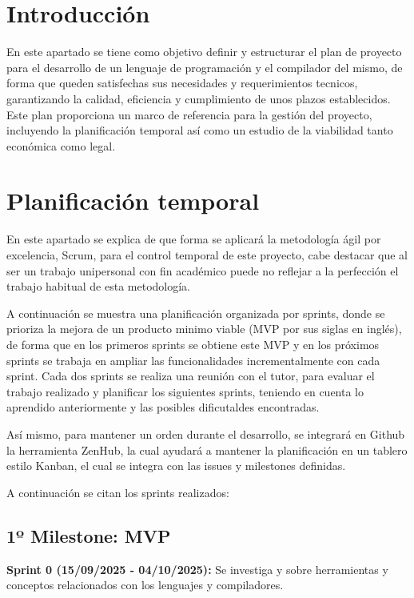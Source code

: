 
\section{Introducción}
En este apartado se tiene como objetivo definir y estructurar el plan de proyecto para el desarrollo de un lenguaje de programación y el compilador del mismo, de forma que queden satisfechas sus necesidades y requerimientos tecnicos, garantizando la calidad, eficiencia y cumplimiento de unos plazos establecidos. Este plan proporciona un marco de referencia para la gestión del proyecto, incluyendo la planificación temporal así como un estudio de la viabilidad tanto económica como legal.

\section{Planificación temporal}
En este apartado se explica de que forma se aplicará la metodología ágil por excelencia, Scrum, para el control temporal de este proyecto, cabe destacar que al ser un trabajo unipersonal con fin académico puede no reflejar a la perfección el trabajo habitual de esta metodología. 

A continuación se muestra una planificación organizada por sprints, donde se prioriza la mejora de un producto minimo viable (MVP por sus siglas en inglés), de forma que en los primeros sprints se obtiene este MVP y en los próximos sprints se trabaja en ampliar las funcionalidades incrementalmente con cada sprint. Cada dos sprints se realiza una reunión con el tutor, para evaluar el trabajo realizado y planificar los siguientes sprints, teniendo en cuenta lo aprendido anteriormente y las posibles dificutaldes encontradas.

Así mismo, para mantener un orden durante el desarrollo, se integrará en Github la herramienta ZenHub, la cual ayudará a mantener la planificación en un tablero estilo Kanban, el cual se integra con las issues y milestones definidas.

A continuación se citan los sprints realizados:

\subsection{1º Milestone: MVP}
\textbf{Sprint 0 (15/09/2025 - 04/10/2025):} Se investiga y sobre herramientas y conceptos relacionados con los lenguajes y compiladores.

